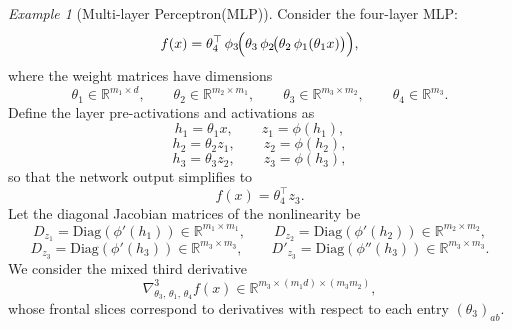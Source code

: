 \documentclass{article}
\theoremstyle{plain}
\theoremstyle{definition}
\theoremstyle{remark}
\newtheorem{example}[theorem]{Example}
\begin{document}
\begin{example}[Multi-layer Perceptron(MLP)]
\label{example:mlp-tsvd}
Consider the four-layer MLP:
\[
f(x)
= \theta_{4}^{\top}\,
\phi_{3}\!\Bigl(
\theta_{3}\,
\phi_{2}\!\bigl(
\theta_{2}\,
\phi_{1}(\theta_{1}x)
\bigr)
\Bigr),
\]
where the weight matrices have dimensions
\[
\theta_{1}\in\mathbb{R}^{m_{1}\times d},\qquad
\theta_{2}\in\mathbb{R}^{m_{2}\times m_{1}},\qquad
\theta_{3}\in\mathbb{R}^{m_{3}\times m_{2}},\qquad
\theta_{4}\in\mathbb{R}^{m_{3}}.
\]
Define the layer pre-activations and activations as
\[
h_{1}=\theta_{1}x, \qquad z_{1}=\phi(h_{1}), 
\]
\[
h_{2}=\theta_{2}z_{1}, \qquad z_{2}=\phi(h_{2}),
\]
\[
h_{3}=\theta_{3}z_{2}, \qquad z_{3}=\phi(h_{3}),
\]
so that the network output simplifies to 
\[
f(x)=\theta_{4}^{\top}z_{3}.
\]
Let the diagonal Jacobian matrices of the nonlinearity be
\[
D_{z_{1}}=\mathrm{Diag}(\phi'(h_{1})) \in \mathbb{R}^{m_{1}\times m_{1}},\qquad
D_{z_{2}}=\mathrm{Diag}(\phi'(h_{2})) \in \mathbb{R}^{m_{2}\times m_{2}},
\]
\[
D_{z_{3}}=\mathrm{Diag}(\phi'(h_{3})) \in \mathbb{R}^{m_{3}\times m_{3}},\qquad
D'_{z_{3}}=\mathrm{Diag}(\phi''(h_{3})) \in \mathbb{R}^{m_{3}\times m_{3}}.
\]
We consider the mixed third derivative
\[
\nabla^{3}_{\theta_{3},\,\theta_{1},\,\theta_{4}} f(x)
\in
\mathbb{R}^{m_{3} \times (m_{1}d) \times (m_{3}m_{2})},
\]
whose frontal slices correspond to derivatives with respect to each entry $(\theta_{3})_{ab}$. 


\end{example}
\end{document}
